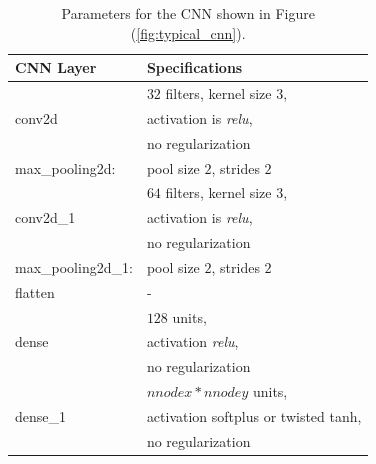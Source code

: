 \documentclass[12pt]{article}
\begin{document}
%
\begin{table}
 \centering
 \begin{tabular}{|l|l|}
   \hline
   CNN Layer & Specifications \\
   \hline
   \multirow{3}{*}{conv2d}  & $32$ filters, kernel size $3$,\\ & activation is \textit{relu},\\& no regularization\\
   \hline
   max\_pooling2d: & pool size $2$, strides $2$\\
   \hline
   \multirow{3}{*}{conv2d\_1} & $64$ filters, kernel size $3$,\\& activation is \textit{relu},\\ & no regularization\\
   \hline
   max\_pooling2d\_1: & pool size $2$, strides $2$\\
   \hline
   flatten & -\\
   \hline
   \multirow{3}{*}{dense}  & $128$ units,\\& activation \textit{relu},\\& no regularization\\
   \hline
   \multirow{3}{*}{dense\_1} & $nnodex*nnodey$ units,\\& activation softplus or twisted tanh,\\& no regularization\\
   \hline
 \end{tabular}
 \caption{\label{table:cnnlayerparams} Parameters for the CNN shown in Figure (\ref{fig:typical_cnn}).}
\end{table}
%
\end{document}
